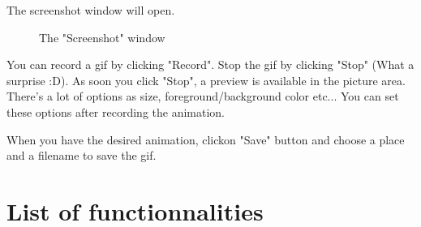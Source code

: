 \documentclass[10pt]{report}
\begin{document}
The screenshot window will open.\newline
\begin{figure}[H]
\centering
{}
\caption{The "Screenshot" window}
\end{figure}

You can record a gif by clicking "Record".\newline
Stop the gif by clicking "Stop" (What a surprise :D).\newline
As soon you click "Stop", a preview is available in the picture area.\newline
There's a lot of options as size, foreground/background color etc...\newline
You can set these options after recording the animation.\newline

When you have the desired animation, clickon "Save" button and choose a place and a filename to save the gif.\newline

\chapter{List of functionnalities}
\end{document}

